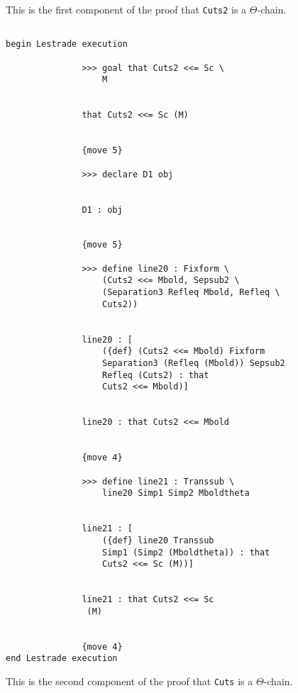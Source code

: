 \documentclass[12pt]{article}
\begin{document}
This is the first component of the proof that {\tt Cuts2} is a $\Theta$-chain.

\begin{verbatim}

begin Lestrade execution

               >>> goal that Cuts2 <<= Sc \
                   M


               that Cuts2 <<= Sc (M)


               {move 5}

               >>> declare D1 obj


               D1 : obj


               {move 5}

               >>> define line20 : Fixform \
                   (Cuts2 <<= Mbold, Sepsub2 \
                   (Separation3 Refleq Mbold, Refleq \
                   Cuts2))


               line20 : [
                   ({def} (Cuts2 <<= Mbold) Fixform 
                   Separation3 (Refleq (Mbold)) Sepsub2 
                   Refleq (Cuts2) : that 
                   Cuts2 <<= Mbold)]


               line20 : that Cuts2 <<= Mbold


               {move 4}

               >>> define line21 : Transsub \
                   line20 Simp1 Simp2 Mboldtheta


               line21 : [
                   ({def} line20 Transsub 
                   Simp1 (Simp2 (Mboldtheta)) : that 
                   Cuts2 <<= Sc (M))]


               line21 : that Cuts2 <<= Sc 
                (M)


               {move 4}
end Lestrade execution
\end{verbatim}

This is the second component of the proof that {\tt Cuts} is a $\Theta$-chain.
\end{document}
